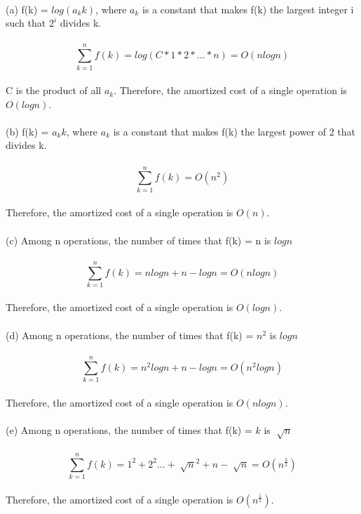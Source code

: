 \begin{problem}{5} ~\\
(a) f(k) = $log(a_k k)$, where $a_k$ is a constant that makes f(k) the largest integer i such that $2^i$ divides k.\\
\\
$$\sum_{k=1}^{n} f(k) = log(C*1*2*...*n) = O(nlogn)$$\\
C is the product of all $a_k$. Therefore, the amortized cost of a single operation is $O(logn)$.\\
\\
(b) f(k) = $a_k k$, where $a_k$ is a constant that makes f(k) the largest power of 2 that divides k.\\
\\
$$\sum_{k=1}^{n} f(k) = O(n^2)$$\\
Therefore, the amortized cost of a single operation is $O(n)$.\\
\\
(c) Among n operations, the number of times that f(k) =  n is $logn$\\
\\
$$\sum_{k=1}^{n} f(k) = nlogn + n - logn = O(nlogn)$$\\
Therefore, the amortized cost of a single operation is $O(logn)$.\\
\\
(d) Among n operations, the number of times that f(k) =  $n^2$ is $logn$\\
\\
$$\sum_{k=1}^{n} f(k) = n^2 logn + n - logn = O(n^2 logn)$$\\
Therefore, the amortized cost of a single operation is $O(nlogn)$.\\
\\
(e) Among n operations, the number of times that f(k) =  $k$ is $\sqrt[]{n}$\\
\\
$$\sum_{k=1}^{n} f(k) = 1^2 + 2^2 ... + \sqrt[]{n}^2 + n - \sqrt[]{n} = O(n^{\frac{3}{2}})$$\\
Therefore, the amortized cost of a single operation is $O(n^\frac{1}{2})$.\\
\end{problem}